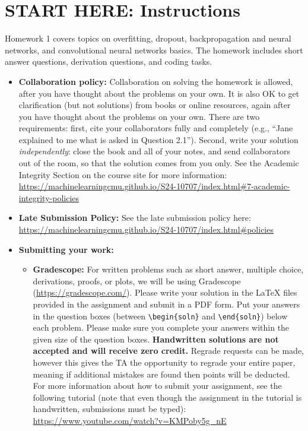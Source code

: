 \section*{START HERE: Instructions}

\begin{notebox}
Homework 1 covers topics on overfitting, dropout, backpropagation and neural networks, and convolutional neural networks basics. The homework includes short answer questions, derivation questions, and coding tasks. 
\end{notebox}

\begin{itemize}
\item \textbf{Collaboration policy:} Collaboration on solving the homework is allowed, after you have thought about the problems on your own. It is also OK to get clarification (but not solutions) from books or online resources, again after you have thought about the problems on your own. There are two requirements: first, cite your collaborators fully and completely (e.g., ``Jane explained to me what is asked in Question 2.1''). Second, write your solution {\em independently}: close the book and all of your notes, and send collaborators out of the room, so that the solution comes from you only.  See the Academic Integrity Section on the course site for more information: \url{https://machinelearningcmu.github.io/S24-10707/index.html#7-academic-integrity-policies}

\item\textbf{Late Submission Policy:} See the late submission policy here:\\
\url{https://machinelearningcmu.github.io/S24-10707/index.html#policies}

\item\textbf{Submitting your work:} 

\begin{itemize}

\item \textbf{Gradescope:} For written problems such as short answer, multiple choice, derivations, proofs, or plots, we will be using Gradescope (\url{https://gradescope.com/}).
Please write your solution in the LaTeX files provided in the assignment and submit in a PDF form. Put your answers in the question boxes (between \texttt{\textbackslash begin\{soln\}} and \texttt{\textbackslash end\{soln\}}) below each problem. Please make sure you complete your answers within the given size of the question boxes. \textbf{Handwritten solutions are not accepted and will receive zero credit.} Regrade requests can be made, however this gives the TA the opportunity to regrade your entire paper, meaning if additional mistakes are found then points will be deducted. For more information about how to submit your assignment, see the following tutorial (note that even though the assignment in the tutorial is handwritten, submissions must be typed): \url{https://www.youtube.com/watch?v=KMPoby5g_nE}


\end{itemize}
\end{itemize}
